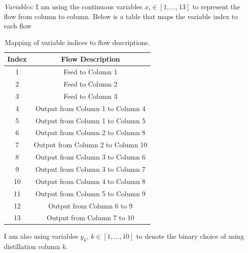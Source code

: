 \documentclass[11pt]{article}
\begin{document}
\textit{Variables:}
I am using the continuous variables $x_i \in [1,\dots,13]$ to represent the flow from column to column.
Below is a table that maps the variable index to each flow
\begin{table}[htbp]
\centering
\begin{tabular}{|c|c|}
\hline
\textbf{Index} & \textbf{Flow Description} \\ \hline
1 & Feed to Column 1 \\ \hline
2 & Feed to Column 2 \\ \hline
3 & Feed to Column 3 \\ \hline
4 & Output from Column 1 to Column 4 \\ \hline
5 & Output from Column 1 to Column 5 \\ \hline
6 & Output from Column 2 to Column 8 \\ \hline
7 & Output from Column 2 to Column 10 \\ \hline
8 & Output from Column 3 to Column 6 \\ \hline
9 & Output from Column 3 to Column 7 \\ \hline
10 & Output from Column 4 to Column 8 \\ \hline
11 & Output from Column 5 to Column 9 \\ \hline
12 & Output from Column 6 to 9 \\ \hline
13 & Output from Column 7 to 10 \\ \hline
\end{tabular}
\caption{Mapping of variable indices to flow descriptions.}
\label{tab:flow_mapping}
\end{table}
I am also using variables $y_k$, $k \in [1,\dots,10]$ to denote the binary choice of using distillation column $k$.
\end{document}
